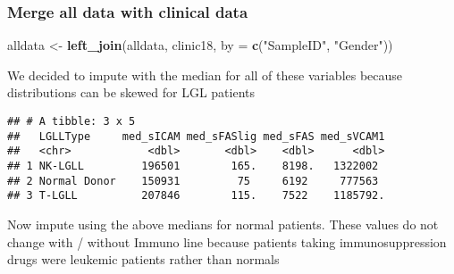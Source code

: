 \documentclass[]{article}
\newenvironment{Shaded}{\begin{snugshade}}{\end{snugshade}}
\newcommand{\KeywordTok}[1]{\textcolor[rgb]{0.13,0.29,0.53}{\textbf{{#1}}}}
\newcommand{\DataTypeTok}[1]{\textcolor[rgb]{0.13,0.29,0.53}{{#1}}}
\newcommand{\StringTok}[1]{\textcolor[rgb]{0.31,0.60,0.02}{{#1}}}
\newcommand{\CommentTok}[1]{\textcolor[rgb]{0.56,0.35,0.01}{\textit{{#1}}}}
\newcommand{\OtherTok}[1]{\textcolor[rgb]{0.56,0.35,0.01}{{#1}}}
\newcommand{\NormalTok}[1]{{#1}}
\begin{document}
\subsubsection{Merge all data with clinical
data}\label{merge-all-data-with-clinical-data}

\begin{Shaded}
\begin{Highlighting}[]
\NormalTok{alldata <-}\StringTok{ }\KeywordTok{left_join}\NormalTok{(alldata, clinic18, }\DataTypeTok{by =} \KeywordTok{c}\NormalTok{(}\StringTok{"SampleID"}\NormalTok{,  }\StringTok{"Gender"}\NormalTok{))}
\end{Highlighting}
\end{Shaded}

We decided to impute with the median for all of these variables because
distributions can be skewed for LGL patients

\begin{Shaded}
\end{Shaded}

\begin{verbatim}
## # A tibble: 3 x 5
##   LGLLType     med_sICAM med_sFASlig med_sFAS med_sVCAM1
##   <chr>            <dbl>       <dbl>    <dbl>      <dbl>
## 1 NK-LGLL         196501        165.    8198.   1322002 
## 2 Normal Donor    150931         75     6192     777563 
## 3 T-LGLL          207846        115.    7522    1185792.
\end{verbatim}

Now impute using the above medians for normal patients. These values do
not change with / without Immuno line because patients taking
immunosuppression drugs were leukemic patients rather than normals
\end{document}
